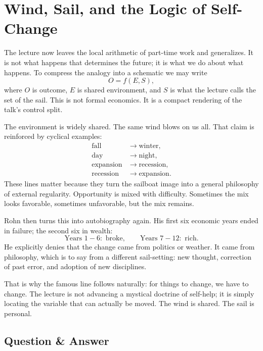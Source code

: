 \section{Wind, Sail, and the Logic of Self-Change}

The lecture now leaves the local arithmetic of part-time work and generalizes. It is not what happens that determines the future; it is what we do about what happens. To compress the analogy into a schematic we may write
\begin{equation}
O = f(E,S),
\end{equation}
where \(O\) is outcome, \(E\) is shared environment, and \(S\) is what the lecture calls the set of the sail. This is not formal economics. It is a compact rendering of the talk's control split.

The environment is widely shared. The same wind blows on us all. That claim is reinforced by cyclical examples:
\begin{align}
\text{fall} &\to \text{winter},\\
\text{day} &\to \text{night},\\
\text{expansion} &\to \text{recession},\\
\text{recession} &\to \text{expansion}.
\end{align}
These lines matter because they turn the sailboat image into a general philosophy of external regularity. Opportunity is mixed with difficulty. Sometimes the mix looks favorable, sometimes unfavorable, but the mix remains.

Rohn then turns this into autobiography again. His first six economic years ended in failure; the second six in wealth:
\begin{equation}
\text{Years }1\!-\!6:\text{ broke},
\qquad
\text{Years }7\!-\!12:\text{ rich}.
\end{equation}
He explicitly denies that the change came from politics or weather. It came from philosophy, which is to say from a different sail-setting: new thought, correction of past error, and adoption of new disciplines.

That is why the famous line follows naturally: for things to change, we have to change. The lecture is not advancing a mystical doctrine of self-help; it is simply locating the variable that can actually be moved. The wind is shared. The sail is personal.

\subsection{Question \& Answer}

